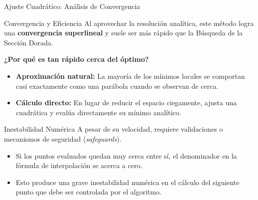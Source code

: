 \begin{frame}{Ajuste Cuadrático: Análisis de Convergencia}
    \begin{block}{Convergencia y Eficiencia}
        \footnotesize
        Al aprovechar la resolución analítica, este método logra una \textbf{convergencia superlineal} y suele ser más rápido que la Búsqueda de la Sección Dorada.
    \end{block}

    \vspace{0.2cm}
    \footnotesize
    \textbf{¿Por qué es tan rápido cerca del óptimo?}
    \scriptsize
    \begin{itemize}
        \item \textbf{Aproximación natural:} La mayoría de los mínimos locales se comportan casi exactamente como una parábola cuando se observan de cerca.
        \item \textbf{Cálculo directo:} En lugar de reducir el espacio ciegamente, ajusta una cuadrática y evalúa directamente su mínimo analítico.
    \end{itemize}

    \begin{alertblock}{Inestabilidad Numérica}
        \scriptsize
        A pesar de su velocidad, requiere validaciones o mecanismos de seguridad (\textit{safeguards}).
        \begin{itemize}
            \item Si los puntos evaluados quedan muy cerca entre sí, el denominador en la fórmula de interpolación se acerca a cero.
            \item Esto produce una grave inestabilidad numérica en el cálculo del siguiente punto que debe ser controlada por el algoritmo.
        \end{itemize}
    \end{alertblock}
\end{frame}